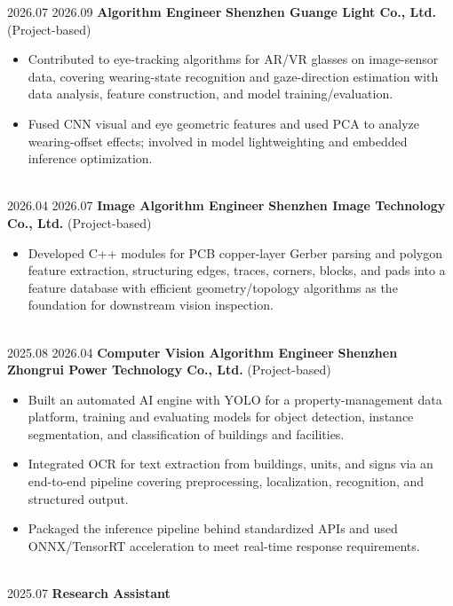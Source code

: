 \documentclass[letterpaper]{DS_class_file} %
\begin{document}
\begin{twenty}
    \twentyitem
        {2026.07}
		{2026.09}
		{\textbf{Algorithm Engineer}}
		{\textbf{Shenzhen Guange Light Co., Ltd.} (Project-based)}
        {}
        {\begin{itemize}
			\item Contributed to eye-tracking algorithms for AR/VR glasses on image-sensor data, covering wearing-state recognition and gaze-direction estimation with data analysis, feature construction, and model training/evaluation.
			\item Fused CNN visual and eye geometric features and used PCA to analyze wearing-offset effects; involved in model lightweighting and embedded inference optimization.
        \end{itemize}}
        \\[-0.35cm]
    \twentyitem
        {2026.04}
		{2026.07}
		{\textbf{Image Algorithm Engineer}}
		{\textbf{Shenzhen Image Technology Co., Ltd.} (Project-based)}
        {}
        {\begin{itemize}
			\item Developed C++ modules for PCB copper-layer Gerber parsing and polygon feature extraction, structuring edges, traces, corners, blocks, and pads into a feature database with efficient geometry/topology algorithms as the foundation for downstream vision inspection.
        \end{itemize}}
        \\[-0.35cm]
    \twentyitem
        {2025.08}
		{2026.04}
		{\textbf{Computer Vision Algorithm Engineer}}
		{\textbf{Shenzhen Zhongrui Power Technology Co., Ltd.} (Project-based)}
        {}
        {\begin{itemize}
			\item Built an automated AI engine with YOLO for a property-management data platform, training and evaluating models for object detection, instance segmentation, and classification of buildings and facilities.
			\item Integrated OCR for text extraction from buildings, units, and signs via an end-to-end pipeline covering preprocessing, localization, recognition, and structured output.
			\item Packaged the inference pipeline behind standardized APIs and used ONNX/TensorRT acceleration to meet real-time response requirements.
        \end{itemize}}
        \\[-0.35cm]
		{2025.07}
		{\textbf{Research Assistant}}

\end{twenty}
\end{document}
